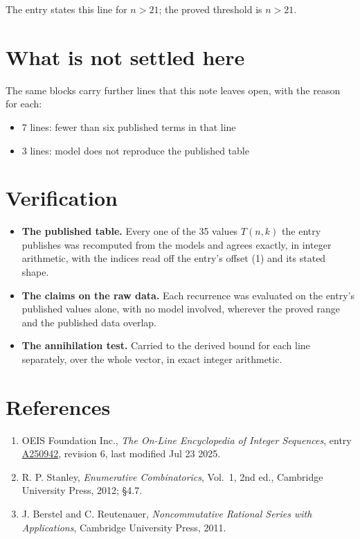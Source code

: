 \documentclass[11pt]{article}
\theoremstyle{definition}
\begin{document}
The entry states this line for $n > 21$; the proved threshold is $n > 21$.

\section{What is not settled here}

The same blocks carry further lines that this note leaves open, with the reason for each:

\begin{itemize}

\item 7 lines: fewer than six published terms in that line

\item 3 lines: model does not reproduce the published table

\end{itemize}

\section{Verification}

\begin{itemize}

\item {\bfseries The published table.} Every one of the 35 values $T(n,k)$ the entry publishes was recomputed from the models and agrees exactly, in integer arithmetic, with the indices read off the entry's offset (1) and its stated shape.

\item {\bfseries The claims on the raw data.} Each recurrence was evaluated on the entry's published values alone, with no model involved, wherever the proved range and the published data overlap.

\item {\bfseries The annihilation test.} Carried to the derived bound for each line separately, over the whole vector, in exact integer arithmetic.

\end{itemize}

\section{References}

\begin{enumerate}

\item OEIS Foundation Inc., \emph{The On-Line Encyclopedia of Integer Sequences}, entry \href{https://oeis.org/A250942}{A250942}, revision 6, last modified Jul 23 2025.

\item R. P. Stanley, \emph{Enumerative Combinatorics}, Vol.~1, 2nd ed., Cambridge University Press, 2012; \S4.7.

\item J. Berstel and C. Reutenauer, \emph{Noncommutative Rational Series with Applications}, Cambridge University Press, 2011.

\end{enumerate}
\end{document}
